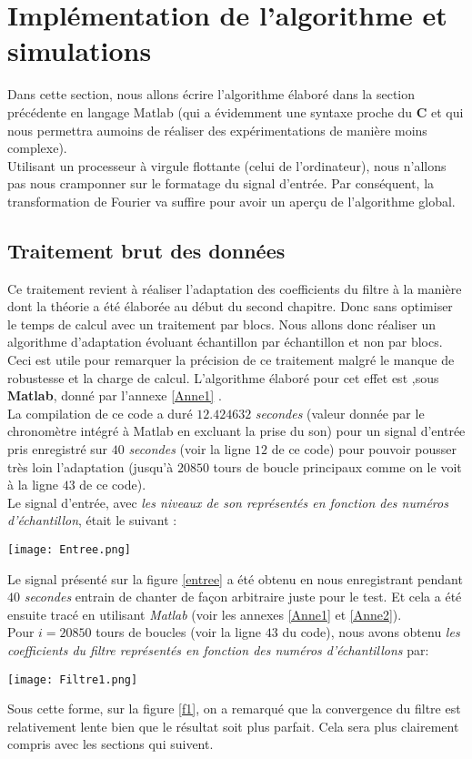 \section{Implémentation de l'algorithme et simulations}
Dans cette section, nous allons écrire l'algorithme élaboré dans la section précédente en langage Matlab (qui a évidemment une syntaxe proche du \textbf{C} et qui nous permettra aumoins de réaliser des expérimentations de manière moins complexe).\\
Utilisant un processeur à virgule flottante (celui de l'ordinateur), nous n'allons pas nous cramponner sur le formatage du signal d'entrée. Par conséquent, la transformation de Fourier va suffire pour avoir un aperçu de l'algorithme global.
\subsection{Traitement brut des données}\label{Brut}
Ce traitement revient à réaliser l'adaptation des coefficients du filtre à la manière dont la théorie a été élaborée au début du second chapitre. Donc sans optimiser le temps de calcul avec un traitement par blocs. Nous allons donc réaliser un algorithme d'adaptation évoluant échantillon par échantillon et non par blocs. Ceci est utile pour remarquer la précision de ce traitement malgré le manque de robustesse et la charge de calcul. L'algorithme élaboré pour cet effet est ,sous \textbf{Matlab}, donné par l'annexe \ref{Anne1} .\\
La compilation de ce code a duré $ 12.424632 $ \emph{secondes} (valeur donnée par le chronomètre intégré à Matlab en excluant la prise du son) pour un signal d'entrée pris enregistré sur $ 40 $ \emph{secondes} (voir la ligne $ 12 $ de ce code) pour pouvoir pousser très loin l'adaptation (jusqu'à $ 20850 $ tours de boucle principaux comme on le voit à la ligne $ 43 $ de ce code).\\
Le signal d'entrée, avec \textit{les niveaux de son représentés en fonction des numéros d'échantillon}, était le suivant :
\begin{center}
\texttt{[image: Entree.png]}
\label{entree}
\end{center}
Le signal présenté sur la figure \ref{entree} a été obtenu en nous enregistrant pendant $ 40 $ \textit{secondes} entrain de chanter de façon arbitraire juste pour le test. Et cela a été ensuite tracé en utilisant \textit{Matlab} (voir les annexes \ref{Anne1} et \ref{Anne2}).\\
Pour $ i=20850 $ tours de boucles (voir la ligne $ 43 $ du code), nous avons obtenu \textit{les coefficients du filtre représentés en fonction des numéros d'échantillons} par: 
\begin{center}
\texttt{[image: Filtre1.png]}
\label{f1}
\end{center}
Sous cette forme, sur la figure \ref{f1}, on a remarqué que la convergence du filtre est relativement lente bien que le résultat soit plus parfait. Cela sera plus clairement compris avec les sections qui suivent.
